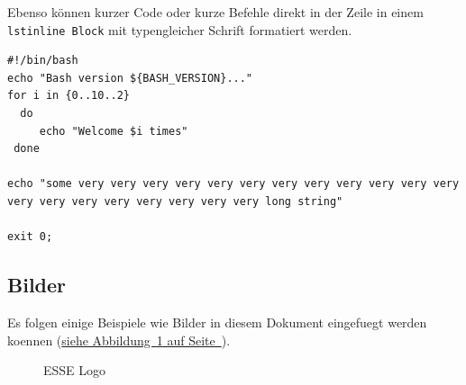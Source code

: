 \documentclass[12pt,a4paper,titlepage,oneside]{scrartcl}
\begin{document}
Ebenso können kurzer Code oder kurze Befehle direkt in der Zeile in einem \lstinline{lstinline Block} mit typengleicher Schrift formatiert werden.



\begin{lstlisting}[caption=Example bash script,label=code:beispiel2,style=simple]
#!/bin/bash
echo "Bash version ${BASH_VERSION}..."
for i in {0..10..2}
  do
     echo "Welcome $i times"
 done

echo "some very very very very very very very very very very very very very very very very very very very very long string"

exit 0;
\end{lstlisting}

\subsection{Bilder}

Es folgen einige Beispiele wie Bilder in diesem Dokument eingefuegt werden koennen
(\hyperref[fig:logo1]{siehe Abbildung~\ref*{fig:logo1} auf Seite~\pageref*{fig:logo1}}).

\begin{figure}[h!]
  \centering
  \caption{ESSE Logo}
  \label{fig:logo1}
\end{figure}


%
%
\end{document}
